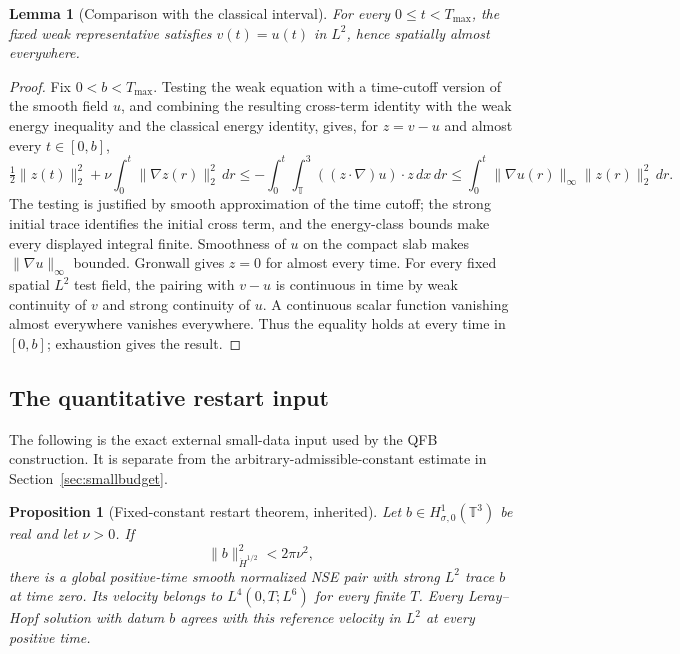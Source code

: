 \documentclass[11pt,a4paper]{article}
\numberwithin{equation}{section}
\theoremstyle{plain}
\newtheorem{proposition}[theorem]{Proposition}
\newtheorem{lemma}[theorem]{Lemma}
\theoremstyle{definition}
\theoremstyle{remark}
\newcommand{\T}{\mathbb T^3}
\newcommand{\HH}[1]{\dot H^{#1}}
\newcommand{\norm}[2]{\lVert #1\rVert_{#2}}
\newcommand{\Tmax}{T_{\max}}
\begin{document}
\begin{lemma}[Comparison with the classical interval]\label{lem:weakstrong}
For every $0\le t<\Tmax$, the fixed weak representative satisfies
$v(t)=u(t)$ in $L^2$, hence spatially almost everywhere.
\end{lemma}
\begin{proof}
Fix $0<b<\Tmax$. Testing the weak equation with a time-cutoff version of
the smooth field $u$, and combining the resulting cross-term identity
with the weak energy inequality and the classical energy identity,
gives, for $z=v-u$ and almost every $t\in[0,b]$,
\[
 \tfrac12\norm{z(t)}{2}^2+\nu\int_0^t\norm{\nabla z(r)}{2}^2\,dr
 \le-\int_0^t\!\int_\T ((z\cdot\nabla)u)\cdot z\,dx\,dr
 \le\int_0^t\norm{\nabla u(r)}{\infty}\norm{z(r)}{2}^2\,dr.
\]
The testing is justified by smooth approximation of the time cutoff;
the strong initial trace identifies the initial cross term, and the
energy-class bounds make every displayed integral finite. Smoothness
of $u$ on the compact slab makes $\norm{\nabla u}{\infty}$ bounded.
Gronwall gives $z=0$ for almost every time. For every fixed spatial
$L^2$ test field, the pairing with $v-u$ is continuous in time by weak
continuity of $v$ and strong continuity of $u$. A continuous scalar
function vanishing almost everywhere vanishes everywhere. Thus the
equality holds at every time in $[0,b]$; exhaustion gives the result.
\end{proof}

\subsection{The quantitative restart input}
The following is the exact external small-data input used by the
QFB construction. It is separate from the arbitrary-admissible-constant
estimate in Section~\ref{sec:smallbudget}.

\begin{proposition}[Fixed-constant restart theorem, inherited]\label{prop:admission}
Let $b\in H^1_{\sigma,0}(\T)$ be real and let $\nu>0$. If
\begin{equation}\label{eq:exactadmission}
 \norm{b}{\HH{1/2}}^2<2\pi\nu^2,
\end{equation}
there is a global positive-time smooth normalized NSE pair with strong
$L^2$ trace $b$ at time zero. Its velocity belongs to
$L^4(0,T;L^6)$ for every finite $T$. Every Leray--Hopf solution with datum
$b$ agrees with this reference velocity in $L^2$ at every positive time.
\end{proposition}
\end{document}
